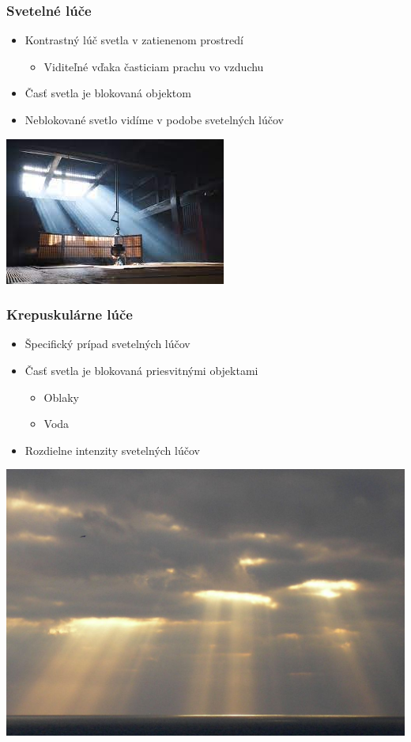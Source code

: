 \documentclass{beamer}
\begin{document}
\begin{frame}[fragile=singleslide]\frametitle{Svetelné lúče}
\begin{itemize}
\item Kontrastný lúč svetla v zatienenom prostredí
	\begin{itemize}
	\item Viditeľné vďaka časticiam prachu vo vzduchu
	\end{itemize}
\item Časť svetla je blokovaná objektom 
\item Neblokované svetlo vidíme v podobe svetelných lúčov
\end{itemize}
\begin{center}
\includegraphics[scale=.5]{Svetelne_luce.jpg}
\end{center}
\end{frame}
	
\begin{frame}[fragile=singleslide]\frametitle{Krepuskulárne lúče}
\begin{itemize}
\item Špecifický prípad svetelných lúčov
\item Časť svetla je blokovaná priesvitnými objektami
	\begin{itemize}
	\item Oblaky
	\item Voda
	\end{itemize}
\item Rozdielne intenzity svetelných lúčov
\end{itemize}
\begin{center}
\includegraphics[scale=.15]{god_ray.jpg}
\end{center}
\end{frame}
\end{document}
